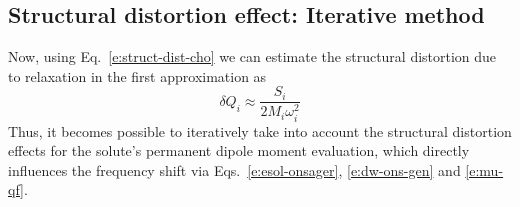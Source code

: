 \documentclass[a4paper,titlepage,twoside,fleqn,12pt]{book}
\begin{document}
\begin{refsection}
\subsection{Structural distortion effect: Iterative method}

Now, using Eq.~\eqref{e:struct-dist-cho}
we can estimate the structural distortion due to relaxation 
in the first approximation as
%
\begin{equation} \label{e:ons-dq-init}
\delta Q_i \approx \frac{S_i}{2M_i\omega_i^2}
\end{equation}
%
Thus, it becomes possible to iteratively take into account 
the structural distortion effects for the solute's permanent
dipole moment evaluation, which directly influences the 
frequency shift via Eqs.~\eqref{e:esol-onsager}, 
\eqref{e:dw-ons-gen} and \eqref{e:mu-qf}.


\end{refsection}
\end{document}
